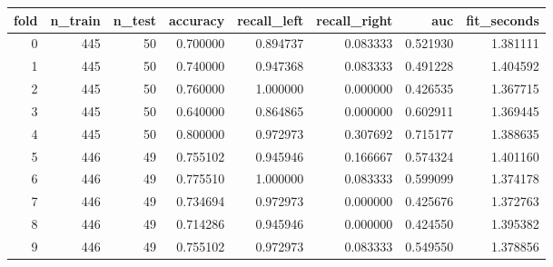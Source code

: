 \begin{tabular}{rrrrrrrr}
\toprule
fold & n_train & n_test & accuracy & recall_left & recall_right & auc & fit_seconds \\
\midrule
0 & 445 & 50 & 0.700000 & 0.894737 & 0.083333 & 0.521930 & 1.381111 \\
1 & 445 & 50 & 0.740000 & 0.947368 & 0.083333 & 0.491228 & 1.404592 \\
2 & 445 & 50 & 0.760000 & 1.000000 & 0.000000 & 0.426535 & 1.367715 \\
3 & 445 & 50 & 0.640000 & 0.864865 & 0.000000 & 0.602911 & 1.369445 \\
4 & 445 & 50 & 0.800000 & 0.972973 & 0.307692 & 0.715177 & 1.388635 \\
5 & 446 & 49 & 0.755102 & 0.945946 & 0.166667 & 0.574324 & 1.401160 \\
6 & 446 & 49 & 0.775510 & 1.000000 & 0.083333 & 0.599099 & 1.374178 \\
7 & 446 & 49 & 0.734694 & 0.972973 & 0.000000 & 0.425676 & 1.372763 \\
8 & 446 & 49 & 0.714286 & 0.945946 & 0.000000 & 0.424550 & 1.395382 \\
9 & 446 & 49 & 0.755102 & 0.972973 & 0.083333 & 0.549550 & 1.378856 \\
\bottomrule
\end{tabular}
